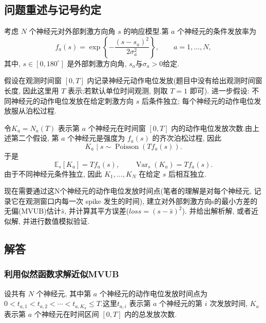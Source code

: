 ﻿\documentclass[UTF8,  zihao=-4]{ctexart}
\begin{document}
\subsection{问题重述与记号约定}
考虑 $N$ 个神经元对外部刺激方向角 $s$ 的响应模型.第 $a$ 个神经元的条件发放率为
\begin{equation}
    f_a(s)
    =
    \exp\left\{
    -\frac{(s-s_a)^2}{2\sigma_a^2}
    \right\},  
    \qquad a=1,  \ldots,  N,  
\end{equation}
其中,  $s\in[0,  180^\circ]$ 是外部刺激方向角,  $s_a$与$\sigma_a>0$给定.

假设在观测时间窗 $[0,  T]$ 内记录神经元动作电位发放(题目中没有给出观测时间窗长度,  因此这里用 $T$ 表示;若默认单位时间观测,  则取 $T=1$ 即可). 进一步假设:
不同神经元的动作电位发放在给定刺激方向 $s$ 后条件独立;
每个神经元的动作电位发放服从泊松过程.

令$K_a = N_a(T)$
表示第 $a$ 个神经元在时间窗 $[0,  T]$ 内的动作电位发放次数.由上述第二个假设,  第 $a$ 个神经元是强度为 $f_a(s)$ 的齐次泊松过程,  因此
\begin{equation}
    K_a \mid s
    \sim
    \operatorname{Poisson}\left(Tf_a(s)\right).
\end{equation}
于是
\[
    \mathbb{E}_s[K_a]
    =
    Tf_a(s),  
    \qquad
    \operatorname{Var}_s(K_a)
    =
    Tf_a(s).
\]
由于不同神经元条件独立,  因此 $K_1,  \ldots,  K_N$ 在给定 $s$ 后相互独立.

现在需要通过这N个神经元的动作电位发放时间点(笔者的理解是对每个神经元,  记录它在观测窗口内每一次 spike 发生的时间),  建立对外部刺激方向s的最小方差的无偏(MVUB)估计$\hat{s}$, 并计算其平方误差($loss=(s-\hat{s})^2$). 并给出解析解, 或者近似解, 并进行数值模拟验证.

\subsection{解答}
\subsubsection{利用似然函数求解近似MVUB}

设共有 $N$ 个神经元, 其中第 $a$ 个神经元的动作电位发放时间点为 $0<t_{a,  1}<t_{a,  2}<\cdots<t_{a,  K_a}\leq T$.这里$t_{a,  i}$ 表示第 $a$ 个神经元的第 $i$ 次发放时间, $K_a$ 表示第 $a$ 个神经元在时间区间 $[0,  T]$ 内的总发放次数.
\end{document}
